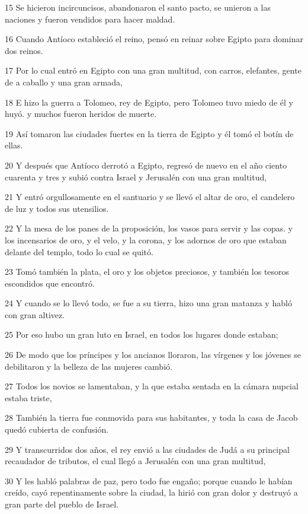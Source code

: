 \par 15 Se hicieron incircuncisos, abandonaron el santo pacto, se unieron a las naciones y fueron vendidos para hacer maldad.
\par 16 Cuando Antíoco estableció el reino, pensó en reinar sobre Egipto para dominar dos reinos.
\par 17 Por lo cual entró en Egipto con una gran multitud, con carros, elefantes, gente de a caballo y una gran armada,
\par 18 E hizo la guerra a Tolomeo, rey de Egipto, pero Tolomeo tuvo miedo de él y huyó. y muchos fueron heridos de muerte.
\par 19 Así tomaron las ciudades fuertes en la tierra de Egipto y él tomó el botín de ellas.
\par 20 Y después que Antíoco derrotó a Egipto, regresó de nuevo en el año ciento cuarenta y tres y subió contra Israel y Jerusalén con una gran multitud,
\par 21 Y entró orgullosamente en el santuario y se llevó el altar de oro, el candelero de luz y todos sus utensilios.
\par 22 Y la mesa de los panes de la proposición, los vasos para servir y las copas. y los incensarios de oro, y el velo, y la corona, y los adornos de oro que estaban delante del templo, todo lo cual se quitó.
\par 23 Tomó también la plata, el oro y los objetos preciosos, y también los tesoros escondidos que encontró.
\par 24 Y cuando se lo llevó todo, se fue a su tierra, hizo una gran matanza y habló con gran altivez.
\par 25 Por eso hubo un gran luto en Israel, en todos los lugares donde estaban;
\par 26 De modo que los príncipes y los ancianos lloraron, las vírgenes y los jóvenes se debilitaron y la belleza de las mujeres cambió.
\par 27 Todos los novios se lamentaban, y la que estaba sentada en la cámara nupcial estaba triste,
\par 28 También la tierra fue conmovida para sus habitantes, y toda la casa de Jacob quedó cubierta de confusión.
\par 29 Y transcurridos dos años, el rey envió a las ciudades de Judá a su principal recaudador de tributos, el cual llegó a Jerusalén con una gran multitud,
\par 30 Y les habló palabras de paz, pero todo fue engaño; porque cuando le habían creído, cayó repentinamente sobre la ciudad, la hirió con gran dolor y destruyó a gran parte del pueblo de Israel.
